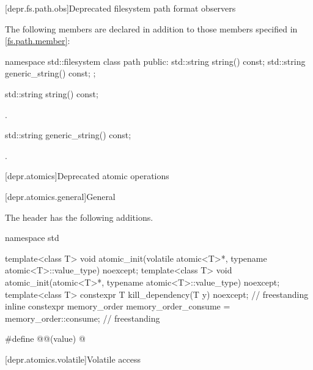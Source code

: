 [depr.fs.path.obs]{Deprecated filesystem path format observers}

%
\pnum
The following members are declared in addition to those members
specified in \ref{fs.path.member}:

\begin{codeblock}
namespace std::filesystem {
  class path {
  public:
    std::string string() const;
    std::string generic_string() const;
  };
}
\end{codeblock}

%
\begin{itemdecl}
std::string string() const;
\end{itemdecl}

\begin{itemdescr}
\pnum
\returns
{}.
\end{itemdescr}

%
\begin{itemdecl}
std::string generic_string() const;
\end{itemdecl}

\begin{itemdescr}
\pnum
\returns
{}.
\end{itemdescr}

[depr.atomics]{Deprecated atomic operations}

[depr.atomics.general]{General}

\pnum
The header  has the following additions.

\begin{codeblock}
namespace std {
  template<class T>
    void atomic_init(volatile atomic<T>*, typename atomic<T>::value_type) noexcept;
  template<class T>
    void atomic_init(atomic<T>*, typename atomic<T>::value_type) noexcept;
  template<class T>
    constexpr T kill_dependency(T y) noexcept;                                  // freestanding
  inline constexpr memory_order memory_order_consume = memory_order::consume;   // freestanding

  #define @@(value) @\seebelow@
}
\end{codeblock}

[depr.atomics.volatile]{Volatile access}

